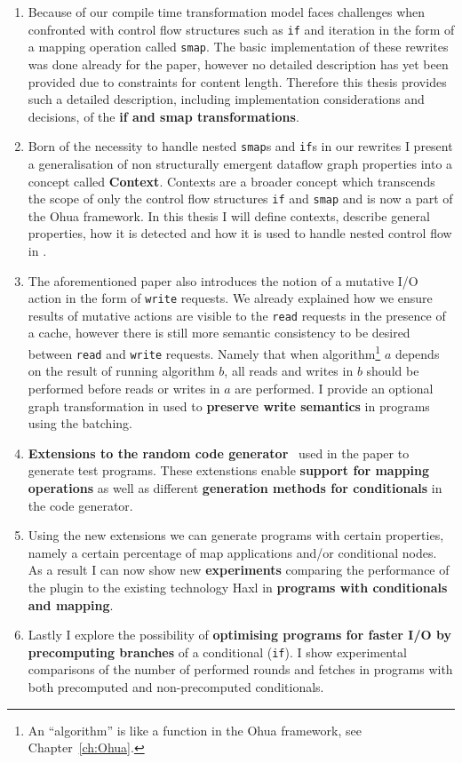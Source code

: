 \begin{enumerate}
    \item Because of our compile time transformation model \yauhau{} faces challenges when confronted with control flow structures such as \texttt{if} and iteration in the form of a mapping operation called \texttt{smap}.
    The basic implementation of these rewrites was done already for the paper, however no detailed description has yet been provided due to constraints for content length.
    Therefore this thesis provides such a detailed description, including implementation considerations and decisions, of the \textbf{if and smap transformations}.
    \item Born of the necessity to handle nested \texttt{smap}s and \texttt{if}s in our rewrites I present a generalisation of non structurally emergent dataflow graph properties into a concept called \textbf{Context}.
    Contexts are a broader concept which transcends the scope of only the control flow structures \texttt{if} and \texttt{smap} and is now a part of the Ohua framework.
    In this thesis I will define contexts, describe general properties, how it is detected and how it is used to handle nested control flow in \yauhau{}.
    \item The aforementioned paper also introduces the notion of a mutative I/O action in the form of \texttt{write} requests.
    We already explained how we ensure results of mutative actions are visible to the \texttt{read} requests in the presence of a cache, however there is still more semantic consistency to be desired between \texttt{read} and \texttt{write} requests.
    Namely that when algorithm\footnote{An ``algorithm'' is like a function in the Ohua framework, see Chapter~\ref{ch:Ohua}.} $a$ depends on the result of running algorithm $b$, all reads and writes in $b$ should be performed before reads or writes in $a$ are performed.
    I provide an optional graph transformation in \yauhau{} used to \textbf{preserve write semantics} in programs using the \yauhau{} batching.
    \item \textbf{Extensions to the random code generator}~\cite{Goens-rand-code-graph} used in the \yauhau{} paper to generate test programs.
    These extenstions enable \textbf{support for mapping operations} as well as different \textbf{generation methods for conditionals} in the code generator.
    \item Using the new extensions we can generate programs with certain properties, namely a certain percentage of map applications and/or conditional nodes.
    As a result I can now show new \textbf{experiments} comparing the performance of the \yauhau{} plugin to the existing technology Haxl in \textbf{programs with conditionals and mapping}.
    \item Lastly I explore the possibility of \textbf{optimising programs for faster I/O by precomputing branches} of a conditional (\texttt{if}).
    I show experimental comparisons of the number of performed rounds and fetches in programs with both precomputed and non-precomputed conditionals.
\end{enumerate}

